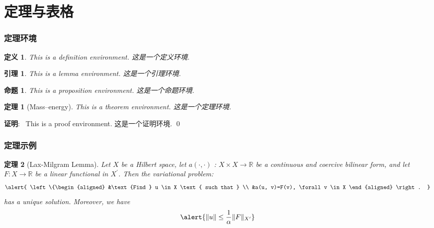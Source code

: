 \documentclass[notheorems]{beamer}
\theoremstyle{plain}
\newtheorem{theorem}{\sffamily 定理}
\numberwithin{theorem}{section}
\newtheorem{definition}{\sffamily 定义}
\numberwithin{definition}{section}
\newtheorem{lemma}{\sffamily 引理}
\numberwithin{lemma}{section}
\newtheorem{proposition}{\sffamily 命题}
\numberwithin{proposition}{section}
\numberwithin{corollary}{section}
\theoremstyle{example}
\renewenvironment{proof}[1][证明]{\textbf{#1}:~}{\qed\par}
\numberwithin{figure}{section}
\numberwithin{table}{section}
\numberwithin{equation}{section}
\begin{document}
\section{定理与表格}

\begin{frame}
\frametitle{定理环境}
\begin{definition} \upshape\rmfamily
This is a definition environment. 这是一个定义环境.
\end{definition}


\begin{lemma} \upshape\rmfamily
This is a lemma environment. 这是一个引理环境.
\end{lemma}

\begin{proposition} \upshape\rmfamily
This is a proposition environment. 这是一个命题环境.
\end{proposition}

\begin{theorem}[Mass--energy] \upshape\rmfamily
This is a theorem environment. 这是一个定理环境.
\end{theorem}

\begin{proof}
  This is a proof environment. 这是一个证明环境.
\end{proof}

\end{frame}



\begin{frame}
\frametitle{定理示例}

\begin{theorem}[Lax-Milgram Lemma] \upshape
Let $X$ be a Hilbert space, let $a(\cdot, \cdot)$ : $X \times X \rightarrow \mathbb{R}$ be a continuous and coercive bilinear form, and let $F : X \rightarrow \mathbb{R}$ be a linear functional in $X^{\prime}$. Then the variational problem:
\begin{equation}
  \alert{
  \left\{\begin{aligned}
  &\text {Find } u \in X \text { such that } \\
  &a(u, v)=F(v), \forall v \in X
  \end{aligned} \right. }
\end{equation}
has a unique solution. Moreover, we have
\begin{equation}
  \alert{ \|u\| \leq \frac{1}{\alpha}\|F\|_{X^{\prime}}  }
\end{equation}
\end{theorem}

\end{frame}
\end{document}
